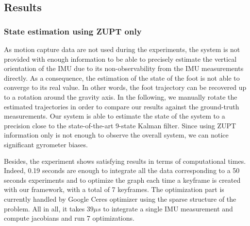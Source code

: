 %

\subsection{Results}
\subsubsection{State estimation using ZUPT only}

As motion capture data are not used during the experiments, the system is not provided with enough information to be able to precisely estimate the vertical orientation of the IMU due to its non-observability from the IMU measurements directly. 
As a consequence, the estimation of the state of the foot is not able to converge to its real value. In other words, the foot trajectory can be recovered up to a rotation around the gravity axis. 
In the following, we manually rotate the estimated trajectories in order to compare our results against the ground-truth measurements.
Our system is able to estimate the state of the system to a precision close to the state-of-the-art 9-state Kalman filter.
Since using ZUPT information only is not enough to observe the overall system, we can notice significant gyrometer biases.

Besides, the experiment shows satisfying results in terms of computational times. Indeed, 0.19 seconds are enough to integrate all the data corresponding to a 50 seconds experiments and to optimize the graph each time a keyframe is created with our framework,
with a total of 7 keyframes.
The optimization part is currently handled by Google Ceres optimizer \cite{Agarwal} using the sparse structure of the problem. All in all, it takes $39 \mu s$ to integrate a single IMU measurement and compute jacobians and run 7 optimizations.


